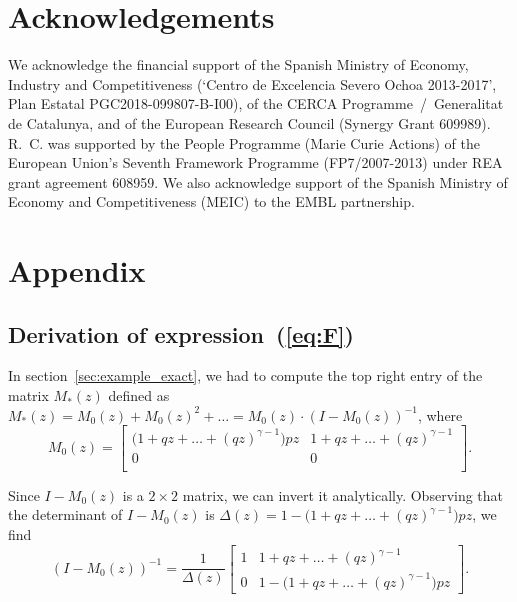 \documentclass{article}
\begin{document}
\section*{Acknowledgements}

We acknowledge the financial support of the Spanish Ministry of Economy,
Industry and Competitiveness (`Centro de Excelencia Severo Ochoa
2013-2017', Plan Estatal PGC2018-099807-B-I00), of the CERCA
Programme~/~Generalitat de Catalunya, and of the European Research Council
(Synergy Grant 609989). R.~C. was supported by the People Programme
(Marie Curie Actions) of the European Union's Seventh Framework Programme
(FP7/2007-2013) under REA grant agreement 608959. We also acknowledge
support of the Spanish Ministry of Economy and Competitiveness (MEIC) to
the EMBL partnership.






\appendix
\section{Appendix}
\subsection{Derivation of expression~(\ref{eq:F})}
\label{app_ex1}

In section~\ref{sec:example_exact}, we had to compute the top right entry
of the matrix $M_*(z)$ defined as $M_*(z) = M_0(z) + M_0(z)^2 + \ldots =
M_0(z) \cdot (I-M_0(z))^{-1}$, where
\begin{equation*}
M_0(z) =
\begin{bmatrix}
\big( 1+qz+\ldots+(qz)^{\gamma-1}
\big) pz  & 1+qz+\ldots+(qz)^{\gamma-1} \\
0 & 0 \\
\end{bmatrix}.
\end{equation*}

Since $I-M_0(z)$ is a $2\times2$ matrix, we can invert it analytically.
Observing that the determinant of $I-M_0(z)$ is $\Delta(z) = 1-\big(
1+qz+\ldots+(qz)^{\gamma-1}\big) pz$, we find
\begin{equation*}
(I-M_0(z))^{-1} = \frac{1}{\Delta(z)}
\begin{bmatrix}
1 & 1+qz+\ldots+(qz)^{\gamma-1} \\
0 & 1-\big( 1+qz+\ldots+(qz)^{\gamma-1} \big) pz
\end{bmatrix}.
\end{equation*}
\end{document}
